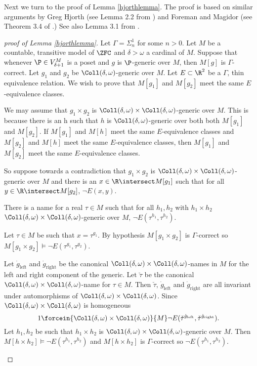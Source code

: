 \documentclass[oneside,12pt]{amsart}
\begin{document}
Next we turn to the proof of Lemma \ref{hjorthlemma}.
The proof is based on similar arguments by Greg Hjorth (see Lemma 2.2 from \cite{Hjorth_applications_of_course_imt}) and Foreman and Magidor (see Theorem 3.4 of \cite{Foreman_and_Magidor}.)
See also Lemma 3.1 from \cite{Schlict_Thin_Equivalence_Relations}.

\begin{proof}[proof of Lemma \ref{hjorthlemma}]
Let $\Gamma = \Sigma^1_n$ for some $n>0$.
Let $M$ be a countable, transitive model of $\ZFC$ and  $\delta>\omega$ a cardinal of $M$.
Suppose that whenever $\P\in V^M_{\delta+1}$ is a poset and $g$ is $\P$-generic over $M$, then
$M[g]$ is $\Gamma$-correct. Let $g_1$ and $g_2$ be $\Coll(\delta,\omega)$-generic over $M$.
Let $E\subset\R^2$ be a $\Gamma$, thin equivalence relation.
We wish to prove that $M[g_1]$ and $M[g_2]$ meet the same $E$-equivalence classes.

We may assume that $g_1\times g_2$ is $\Coll(\delta,\omega)\times \Coll(\delta,\omega)$-generic over $M$.
This is because there is an h such that $h$ is $\Coll(\delta,\omega)$-generic over both
both $M[g_1]$ and $M[g_2]$. If $M[g_1]$ and $M[h]$ meet the same $E$-equivalence classes and
$M[g_2]$ and $M[h]$ meet the same $E$-equivalence classes, then
$M[g_1]$ and $M[g_2]$ meet the same $E$-equivalence classes.

So suppose towards a contradiction that $g_1\times g_2$ is $\Coll(\delta,\omega)\times \Coll(\delta,\omega)$-generic over $M$
and there is an $x\in\R\intersect M[g_1]$ such that for all $y\in \R\intersect M[g_2]$, $\neg E(x,y)$.

\begin{claim}[Claim 1]
There is a name for a real $\tau\in M$ such that for all $h_1,h_2$
with $h_1\times h_2$ $\Coll(\delta,\omega)\times \Coll(\delta,\omega)$-generic over $M$,
$\neg E(\tau^{h_1},\tau^{h_2})$.
\end{claim}
\begin{subproof}
Let $\tau\in M$ be such that $x=\tau^{g_1}$. By hypothesis $M[g_1\times g_2]$ is $\Gamma$-correct
so $M[g_1\times g_2]\models \neg E(\tau^{g_1},\tau^{g_2})$.

Let $\dot{g}_{\text{left}}$ and $\dot{g}_{\text{right}}$
be the canonical $\Coll(\delta,\omega)\times \Coll(\delta,\omega)$-names in $M$ for the left and right component of the generic.
Let $\check{\tau}$ be the canonical $\Coll(\delta,\omega)\times \Coll(\delta,\omega)$-name for $\tau\in M$.
Then $\check{\tau}$, $\dot{g}_{\text{left}}$ and $\dot{g}_{\text{right}}$ are all invariant under automorphisms of $\Coll(\delta,\omega)\times \Coll(\delta,\omega)$.
Since $\Coll(\delta,\omega)\times \Coll(\delta,\omega)$ is homogeneous
$$1\forcein{\Coll(\delta,\omega)\times \Coll(\delta,\omega)}{M} \neg E(\check{\tau}^{\dot{g}_{\text{left}}},\check{\tau}^{\dot{g}_{\text{right}}}).$$
Let $h_1,h_2$ be such that $h_1\times h_2$ is $\Coll(\delta,\omega)\times \Coll(\delta,\omega)$-generic over $M$.
Then $M[h\times h_2]\models \neg E(\tau^{h_1},\tau^{h_2})$ and $M[h\times h_2]$ is $\Gamma$-correct so $\neg E(\tau^{h_1},\tau^{h_2})$.
\end{subproof}


\end{proof}
\end{document}
